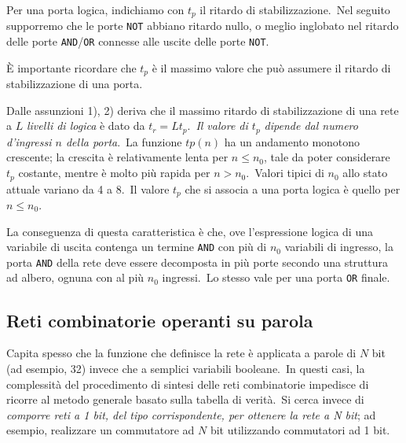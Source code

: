 \noindent Per una porta logica, indichiamo con $t_p$ il ritardo di stabilizzazione.\
Nel seguito supporremo che le porte \texttt{NOT} abbiano ritardo nullo, o meglio inglobato nel ritardo delle porte \texttt{AND}/\texttt{OR} connesse alle uscite delle porte \texttt{NOT}.

È importante ricordare che $t_p$ è il massimo valore che può assumere il ritardo di stabilizzazione di una porta.

Dalle assunzioni 1), 2) deriva che il massimo ritardo di stabilizzazione di una rete a $L$ \textit{livelli di logica} è dato da $t_r = Lt_p$.\
\textit{Il valore di $t_p$ dipende dal numero d'ingressi $n$ della porta}.\
La funzione $tp(n)$ ha un andamento monotono crescente; la crescita è relativamente lenta per $n\leq n_0$, tale da poter considerare $t_p$ costante, mentre è molto più rapida per $n>n_0$.\
Valori tipici di $n_0$ allo stato attuale variano da 4 a 8.\
Il valore $t_p$ che si associa a una porta logica è quello per $n\leq n_0$.

La conseguenza di questa caratteristica è che, ove l'espressione logica di una variabile di uscita contenga un termine \texttt{AND} con più di $n_0$ variabili di ingresso, la porta \texttt{AND} della rete deve essere decomposta in più porte secondo una struttura ad albero, ognuna con al più $n_0$ ingressi.\
Lo stesso vale per una porta \texttt{OR} finale.

\subsection{Reti combinatorie operanti su parola}

Capita spesso che la funzione che definisce la rete è applicata a parole di $N$ bit (ad esempio, 32) invece che a semplici variabili booleane.\
In questi casi, la complessità del procedimento di sintesi delle reti combinatorie impedisce di ricorre al metodo generale basato sulla tabella di verità.\
Si cerca invece di \textit{comporre reti a 1 bit, del tipo corrispondente, per ottenere la rete a N bit}; ad esempio, realizzare un commutatore ad $N$ bit utilizzando commutatori ad 1 bit.

